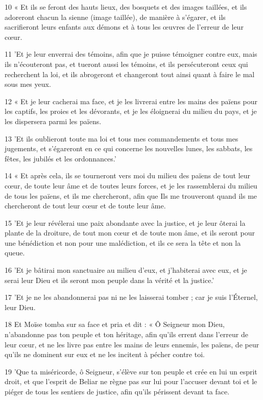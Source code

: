 \par 10 « Et ils se feront des hauts lieux, des bosquets et des images taillées, et ils adoreront chacun la sienne (image taillée), de manière à s'égarer, et ils sacrifieront leurs enfants aux démons et à tous les œuvres de l'erreur de leur cœur.
\par 11 'Et je leur enverrai des témoins, afin que je puisse témoigner contre eux, mais ils n'écouteront pas, et tueront aussi les témoins, et ils persécuteront ceux qui recherchent la loi, et ils abrogeront et changeront tout ainsi quant à faire le mal sous mes yeux.
\par 12 « Et je leur cacherai ma face, et je les livrerai entre les mains des païens pour les captifs, les proies et les dévorants, et je les éloignerai du milieu du pays, et je les dispersera parmi les païens.
\par 13 'Et ils oublieront toute ma loi et tous mes commandements et tous mes jugements, et s'égareront en ce qui concerne les nouvelles lunes, les sabbats, les fêtes, les jubilés et les ordonnances.'
\par 14 « Et après cela, ils se tourneront vers moi du milieu des païens de tout leur cœur, de toute leur âme et de toutes leurs forces, et je les rassemblerai du milieu de tous les païens, et ils me chercheront, afin que Ils me trouveront quand ils me chercheront de tout leur cœur et de toute leur âme.
\par 15 'Et je leur révélerai une paix abondante avec la justice, et je leur ôterai la plante de la droiture, de tout mon cœur et de toute mon âme, et ils seront pour une bénédiction et non pour une malédiction, et ils ce sera la tête et non la queue.
\par 16 'Et je bâtirai mon sanctuaire au milieu d'eux, et j'habiterai avec eux, et je serai leur Dieu et ils seront mon peuple dans la vérité et la justice.'
\par 17 'Et je ne les abandonnerai pas ni ne les laisserai tomber ; car je suis l'Éternel, leur Dieu.
\par 18 Et Moïse tomba sur sa face et pria et dit : « Ô Seigneur mon Dieu, n'abandonne pas ton peuple et ton héritage, afin qu'ils errent dans l'erreur de leur cœur, et ne les livre pas entre les mains de leurs ennemis, les païens, de peur qu'ils ne dominent sur eux et ne les incitent à pécher contre toi.
\par 19 'Que ta miséricorde, ô Seigneur, s'élève sur ton peuple et crée en lui un esprit droit, et que l'esprit de Beliar ne règne pas sur lui pour l'accuser devant toi et le piéger de tous les sentiers de justice, afin qu'ils périssent devant ta face.
